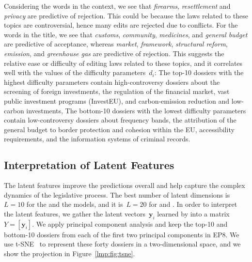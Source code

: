 Considering the words in the context, we see that \textit{firearms}, \textit{resettlement} and \textit{privacy} are predictive of rejection.
This could be because the laws related to these topics are controversial, hence many edits are rejected due to conflicts.
For the words in the title, we see that \textit{customs}, \textit{community}, \textit{medicines}, and \textit{general budget} are predictive of acceptance, whereas \textit{market}, \textit{framework}, \textit{structural reform}, \textit{emission},  and \textit{greenhouse gas} are predictive of rejection.
This suggests the relative ease or difficulty of editing laws related to these topics, and it correlates well with the values of the difficulty parameters~$d_i$:
The top-10 dossiers with the highest difficulty parameters contain high-controversy dossiers about the screening of foreign investments, the regulation of the financial market, vast public investment programs (InvestEU), and  carbon-emission reduction and low-carbon investments,
The bottom-10 dossiers with the lowest difficulty parameters contain low-controversy dossiers about frequency bands, the attribution of the general budget to border protection and cohesion within the EU, accessibility requirements, and the information systems of criminal records.

\subsection{Interpretation of Latent Features}

The latent features improve the predictions overall and help capture the complex dynamics of the legislative process.
The best number of latent dimensions is~$L = 10$  for the  and the  models, and it is~$L = 20$ for  and .
In order to interpret the latent features, we gather the latent vectors~$\bm{y}_i$ learned by  into a matrix~$Y = [ \bm{y}_i ]$.
We apply principal component analysis and keep the top-10 and bottom-10 dossiers from each of the first two principal components in EP8.
We use t-SNE~\cite{maaten2008visualizing} to represent these forty dossiers in a two-dimensional space, and we show the projection in Figure~\ref{lmp:fig:tsne}.

